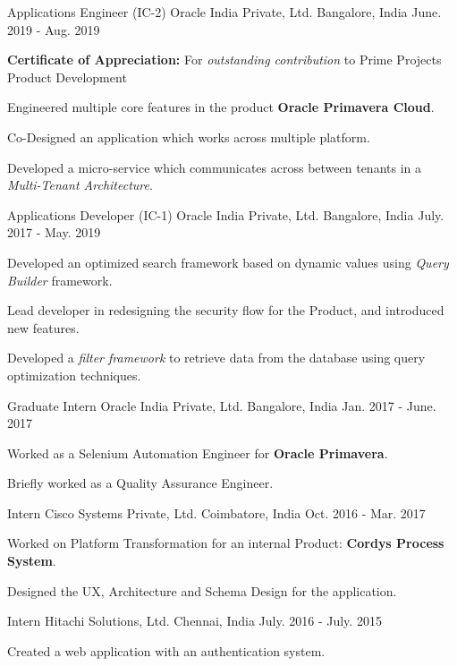 \begin{cventries}
  \cventry
    {Applications Engineer (IC-2)}
    {Oracle India Private, Ltd.}
    {Bangalore, India}
    {June. 2019 - Aug. 2019}
    {
      \begin{cvitems}
        \item {\textbf{Certificate of Appreciation:} For \textit{outstanding contribution} to Prime Projects Product Development}
        \item {Engineered multiple core features in the product \textbf{Oracle Primavera Cloud}.}
        \item {Co-Designed an application which works across multiple platform.}
        \item {Developed a micro-service which communicates across between tenants in a \textit{Multi-Tenant Architecture}.}
      \end{cvitems}
    }
  \cventry
    {Applications Developer (IC-1)}
    {Oracle India Private, Ltd.}
    {Bangalore, India}
    {July. 2017 - May. 2019}
    {
      \begin{cvitems}
        \item {Developed an optimized search framework based on dynamic values using \textit{Query Builder} framework.}
        \item {Lead developer in redesigning the security flow for the Product, and introduced new features.}
        \item {Developed a \textit{filter framework} to retrieve data from the database using query optimization techniques.}
      \end{cvitems}
    }
  \cventry
    {Graduate Intern}
    {Oracle India Private, Ltd.}
    {Bangalore, India}
    {Jan. 2017 - June. 2017}
    {
      \begin{cvitems}
        \item {Worked as a Selenium Automation Engineer for \textbf{Oracle Primavera}.}
        \item {Briefly worked as a Quality Assurance Engineer.}
      \end{cvitems}
    }
  \cventry
    {Intern}
    {Cisco Systems Private, Ltd.}
    {Coimbatore, India}
    {Oct. 2016 - Mar. 2017}
    {
      \begin{cvitems}
        \item {Worked on Platform Transformation for an internal Product: \textbf{Cordys Process System}.}
        \item {Designed the UX, Architecture and Schema Design for the application.}
      \end{cvitems} 
    }
  \cventry
    {Intern}
    {Hitachi Solutions, Ltd.}
    {Chennai, India}
    {July. 2016 - July. 2015}
    {
      \begin{cvitems}
        \item {Created a web application with an authentication system.}    
      \end{cvitems}
    }
\end{cventries}